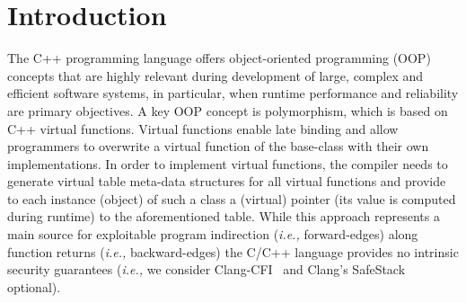 \section{Introduction}
\label{chapter:Introduction}

The C++ programming language offers object-oriented programming (OOP) concepts that are highly relevant 
during development of large, complex and efficient software systems, in particular, 
when runtime performance and reliability are primary objectives.
A key OOP concept is polymorphism, which is based on C++ virtual functions. 
Virtual functions enable late binding and allow programmers 
to overwrite a virtual function of the base-class with their own implementations. 
In order to implement virtual functions, 
the compiler needs to generate virtual table meta-data structures for all virtual functions and provide to each 
instance (object) of such a class a (virtual) pointer (its value is computed during runtime) to the aforementioned table.
While this approach represents a main source for exploitable program indirection (\textit{i.e.,} forward-edges) 
along function returns (\textit{i.e.,} backward-edges) the C/C++ language provides no intrinsic security guarantees 
(\textit{i.e.,} we consider Clang-CFI~\cite{clang:cfi} and Clang's SafeStack \cite{safestack} optional). 



